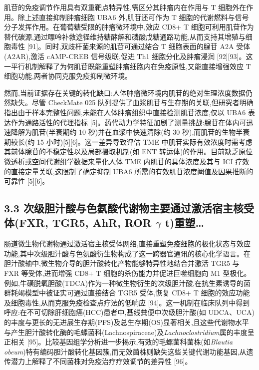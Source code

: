 \documentclass[11pt]{article}
\begin{document}
肌苷的免疫调节作用具有双重靶点特异性,需区分其肿瘤内在作用与 T 细胞外在作用。除上述直接抑制肿瘤细胞 UBA6 外,肌苷还可作为 T 细胞的代谢燃料与信号分子发挥作用。在葡萄糖受限的肿瘤微环境中,效应 CD8+ T 细胞可利用肌苷作为替代碳源,通过嘌呤补救途径维持糖酵解和磷酸戊糖通路功能,从而支持其增殖与细胞毒性 {[}91{]}。同时,双歧杆菌来源的肌苷可通过结合 T 细胞表面的腺苷 A2A 受体(A2AR),激活 cAMP-CREB 信号级联,促进 Th1 细胞分化及肿瘤浸润 {[}92{]}{[}93{]}。这一平行机制解释了为何肌苷既能重塑肿瘤细胞内在免疫原性,又能直接增强效应 T 细胞功能,两者协同克服免疫抑制微环境。

然而,当前证据存在关键的转化缺口:人体肿瘤微环境内肌苷的绝对生理浓度数据仍然缺失。尽管 CheckMate 025 队列提供了血浆肌苷与生存期的关联,但研究者明确指出由于样本完整性问题,未能在人体肿瘤组织中直接检测肌苷浓度,仅以 UBA6 表达作为通路活性的代理指标 {[}5{]}。药代动力学特征加剧了测量挑战:腺苷在体内可迅速降解为肌苷(半衰期约 10 秒)并在血浆中快速清除(约 30 秒),而肌苷的生物半衰期较长(约 15 小时){[}5{]}{[}6{]}。这一差异导致评估 TME 中肌苷实际有效浓度时需考虑其前体腺苷的不稳定性以及局部摄取机制(如 ENT 转运体)的作用。目前缺乏原位微透析或空间代谢组学数据来量化人体 TME 内肌苷的具体浓度及其与 ICI 疗效的直接定量关联,这限制了确定抑制 UBA6 所需的有效肌苷浓度阈值及因果推断的可靠性 {[}5{]}{[}6{]}。

\subsection{\texorpdfstring{3.3 次级胆汁酸与色氨酸代谢物主要通过激活宿主核受体(FXR, TGR5, AhR, ROR \(\gamma\) t)重塑\ldots{}}{3.3 次级胆汁酸与色氨酸代谢物主要通过激活宿主核受体(FXR, TGR5, AhR, ROR \textbackslash gamma t)重塑\ldots{}}}\label{ux6b21ux7ea7ux80c6ux6c41ux9178ux4e0eux8272ux6c28ux9178ux4ee3ux8c22ux7269ux4e3bux8981ux901aux8fc7ux6fc0ux6d3bux5bbfux4e3bux6838ux53d7ux4f53fxr-tgr5-ahr-ror-gamma-tux91cdux5851}

肠道微生物代谢物通过激活宿主核受体网络,直接重塑免疫细胞的极化状态与效应功能,其中次级胆汁酸与色氨酸衍生物构成了这一跨器官通讯的核心化学语言。在胆汁酸轴中,微生物介导的胆汁酸转化产物能够特异性地结合并激活 TGR5 与 FXR 等受体,进而增强 CD8+ T 细胞的杀伤能力并促进巨噬细胞向 M1 型极化。例如,牛磺脱氧胆酸(TDCA)作为一种微生物衍生的次级胆汁酸,在抗生素诱导的菌群耗竭模型中被证实可通过直接结合 TGR5 受体,恢复 CD8+ T 细胞的效应功能及细胞毒性,从而克服免疫检查点疗法的低响应 {[}94{]}。这一机制在临床队列中得到呼应:在不可切除肝细胞癌(HCC)患者中,基线粪便中次级胆汁酸(如 UDCA、UCA)的丰度与更长的无进展生存期(PFS)及总生存期(OS)显著相关,且这些代谢物水平与产生胆汁酸转化酶的毛螺菌科(Lachnospiraceae)及\emph{Lachnoclostridium}属的丰度呈正相关 {[}95{]}。比较基因组学分析进一步揭示,有效的毛螺菌科菌株(如\emph{Blautia obeum})特有编码胆汁酸转化基因簇,而无效菌株则缺失这些关键代谢功能基因,从遗传潜力上解释了不同菌株对免疫治疗疗效调节的差异性 {[}96{]}。
\end{document}
